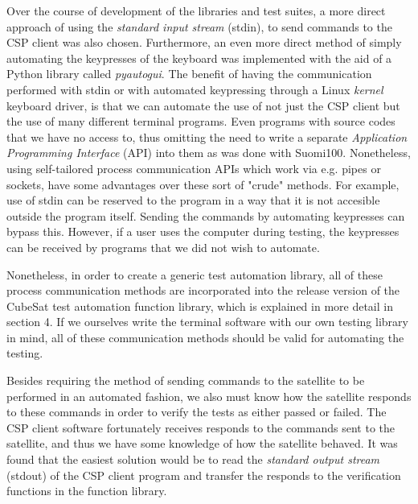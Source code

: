 \documentclass[english,12pt,a4paper,pdftex,elec,utf8]{aaltothesis}
\begin{document}
Over the course of development of the libraries and test suites, a more direct approach of using the \textit{standard input stream} (stdin), to send commands to the CSP client was also chosen. Furthermore, an even more direct method of simply automating the keypresses of the keyboard was implemented with the aid of a Python library called \textit{pyautogui}. The benefit of having the communication performed with stdin or with automated keypressing through a Linux \textit{kernel} keyboard driver, is that we can automate the use of not just the CSP client but the use of many different terminal programs. Even programs with source codes that we have no access to, thus omitting the need to write a separate \textit{Application Programming Interface} (API) into them as was done with Suomi100. Nonetheless, using self-tailored process communication APIs which work via e.g. pipes or sockets, have some advantages over these sort of "crude" methods. For example, use of stdin can be reserved to the program in a way that it is not accesible outside the program itself. Sending the commands by automating keypresses can bypass this. However, if a user uses the computer during testing, the keypresses can be received by programs that we did not wish to automate.\par
Nonetheless, in order to create a generic test automation library, all of these process communication methods are incorporated into the release version of the CubeSat test automation function library, which is explained in more detail in section 4.
If we ourselves write the terminal software with our own testing library in mind, all of these communication methods should be valid for automating the testing.  \par 
Besides requiring the method of sending commands to the satellite to be performed in an automated fashion, we also must know how the satellite responds to these commands in order to verify the tests as either passed or failed. The CSP client software fortunately receives responds to the commands sent to the satellite, and thus we have some knowledge of how the satellite behaved. It was found that the easiest solution would be to read the \textit{standard output stream} (stdout) of the CSP client program and transfer the responds to the verification functions in the function library.\par
\end{document}
